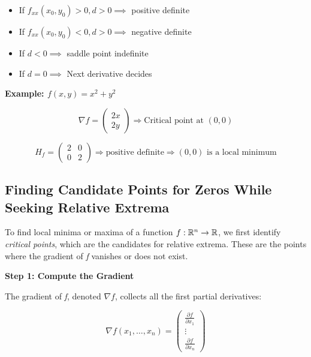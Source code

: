 \begin{itemize}

    \item If \(f_{xx}(x_0, y_0) > 0, d > 0 \implies\) positive definite

    \item If \(f_{xx}(x_0, y_0) < 0, d > 0 \implies\) negative definite

    \item If \(d < 0 \implies \) saddle point indefinite

    \item If \(d = 0 \implies \) Next derivative decides

\end{itemize}

\textbf{Example: \( f(x, y) = x^2 + y^2 \)}

\[
    \nabla f = \begin{pmatrix} 2x \\ 2y \end{pmatrix} \Rightarrow \text{Critical point at } (0, 0)
\]

\[
    H_f = \begin{pmatrix} 2 & 0 \\ 0 & 2 \end{pmatrix} \Rightarrow \text{positive definite}
    \Rightarrow (0, 0) \text{ is a local minimum}
\]

\subsection{Finding Candidate Points for Zeros While Seeking Relative Extrema}

To find local minima or maxima of a function \( f : \mathbb{R}^n \to \mathbb{R} \), we first identify 
\emph{critical points}, which are the candidates for relative extrema. 
These are the points where the gradient of \emph{f} vanishes or does not exist.
\vspace{\baselineskip}

\textbf{Step 1: Compute the Gradient}

The gradient of \emph{f}, denoted \( \nabla f \), collects all the first partial derivatives:

\[
    \nabla f(x_1, \dots, x_n) =
    \begin{pmatrix}
    \frac{\partial f}{\partial x_1} \\
    \vdots \\
    \frac{\partial f}{\partial x_n}
    \end{pmatrix}
\]

